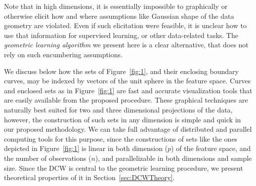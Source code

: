 \documentclass[twoside]{article}
\begin{document}
Note that in high dimensions, it is 
essentially impossible to graphically or otherwise elicit how and where assumptions like 
Gaussian shape of the data geometry are violated. Even if such elicitation were feasible, 
it is unclear how to use that information for supervised learning, or other data-related 
tasks. The {\it geometric learning algorithm} we present here is a clear alternative, 
that does not rely on such encumbering assumptions. 





We discuss below how the sets of Figure~\ref{fig:1}, 
 and their enclosing boundary curves, may be indexed by vectors of the 
unit sphere in the feature space. 
Curves and enclosed sets as in Figure~\ref{fig:1} are fast and accurate visualization 
tools that are easily available from the proposed procedure. These graphical techniques 
are naturally best suited for two and three dimensional projections of the data, however, 
the construction of such sets in any dimension is simple and quick in our proposed 
methodology. We can take full advantage of distributed and parallel computing tools 
for  this purpose, since the constructions of sets like the ones depicted in 
Figure~\ref{fig:1} is linear in both dimension ($p$) of the feature space, and 
the number of observations ($n$), and parallelizable in both dimensions and sample size. 
Since the DCW is central to the geometric learning procedure, 
we present theoretical properties of it 
in Section~\ref{sec:DCWTheory}.  
\end{document}
